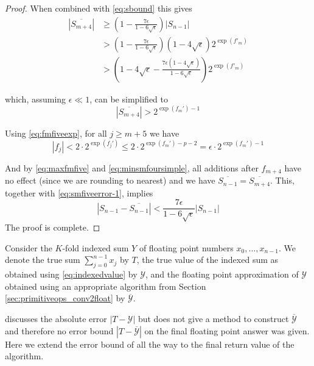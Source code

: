 \begin{proof}
      When combined with \eqref{eq:sbound} this gives
      \begin{align*}
        \left|\overline{S_{m+4}}\right|
        & \geq \left(1-\frac{7 \epsilon}{1-6\sqrt{\epsilon}}\right) |S_{n-1}| \\
        & > \left(1-\frac{7 \epsilon}{1-6\sqrt{\epsilon}}\right) \left(1-4\sqrt{\epsilon}\right) 2^{\exp(f'_m)} \\
        & > \left(1-4\sqrt{\epsilon} - \frac{7 \epsilon \left(1-4\sqrt{\epsilon}\right)}{1-6\sqrt{\epsilon}}\right) 2^{\exp(f'_m)}
      \end{align*}

      which, assuming $\epsilon \ll 1$, can be simplified to
      \begin{equation}
        \left|\overline{S_{m + 4}}\right| > 2^{\exp(f_m') - 1}
        \label{eq:minsmfoursimple}
      \end{equation}

      Using  \eqref{eq:fmfiveexp}, for all $j \geq m + 5$ we have
      \begin{equation}
        |f_j| < 2 \cdot 2^{\exp(f_j')} \leq 2 \cdot 2^{\exp(f_m') - p - 2} = \epsilon \cdot 2^{\exp(f_m') - 1}
        \label{eq:maxfmfive}
      \end{equation}

      And by \eqref{eq:maxfmfive} and \eqref{eq:minsmfoursimple}, all additions
      after $f_{m + 4}$ have no effect (since we are rounding to nearest)
      and we have $\overline{S_{n-1}} = \overline{S_{m+4}}$.
      This, together with \eqref{eq:smfiveerror-1}, implies
      \begin{equation*}
        \left|S_{n-1} - \overline{S_{n-1}}\right| < \frac{7\epsilon}{1-6\sqrt{\epsilon}} |S_{n-1}|
      \end{equation*}
      The proof is complete.
    \end{proof}

    Consider the $K$-fold indexed sum $Y$ of floating point numbers $x_0, \ldots, x_{n - 1}$.
    We denote the true sum $\sum \limits_{j = 0}^{n - 1} x_j$ by $T$, the true
    value of the indexed sum as obtained using \eqref{eq:indexedvalue} by
    $\mathcal{Y}$, and the floating point approximation of $\mathcal{Y}$
    obtained using an appropriate algorithm from Section
    \ref{sec:primitiveops_conv2float} by $\overline{\mathcal{Y}}$.

    \cite{repsum} discusses the absolute error $|T - \mathcal{Y}|$ but does not
    give a method to construct $\overline{\mathcal{Y}}$ and therefore no error
    bound $|T - \overline{\mathcal{Y}}|$ on the final floating point answer
    was given. Here we extend the error bound of \cite{repsum} all the way to
    the final return value of the algorithm.

